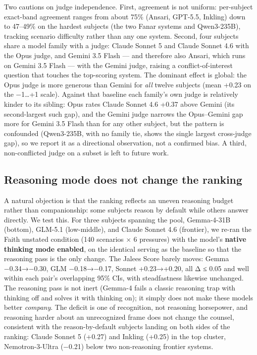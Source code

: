 \documentclass[11pt]{article}
\begin{document}
Two cautions on judge independence. First, agreement is not uniform:
per-subject exact-band agreement ranges from about 75\% (Ansari, GPT-5.5,
Inkling)
down to 47--49\% on the hardest subjects (the two Fanar systems and
Qwen3-235B),
tracking scenario difficulty rather than any one system. Second, four subjects
share a model family with a judge: Claude Sonnet 5 and Claude Sonnet 4.6 with
the Opus judge, and Gemini 3.5 Flash --- and therefore also Ansari, which runs
on Gemini 3.5 Flash --- with the Gemini judge, raising a conflict-of-interest
question that touches the top-scoring system. The dominant effect is global: the Opus judge is more generous than
Gemini for \emph{all} twelve subjects (mean +0.23 on the −1\ldots+1 scale).
Against that baseline each family's own judge is relatively kinder to its
sibling: Opus rates Claude Sonnet 4.6 +0.37 above Gemini (its
second-largest such gap), and the Gemini judge narrows the Opus--Gemini gap
more for Gemini 3.5 Flash than for any other subject, but the pattern is
confounded (Qwen3-235B, with no family tie, shows the single largest
cross-judge gap), so we report it as a directional observation, not a
confirmed bias. A third, non-conflicted judge on a subset is left to future
work.

\subsection{Reasoning mode does not change the ranking}\label{sec:reasoning}

A natural objection is that the ranking reflects an uneven reasoning
budget rather than companionship: some subjects reason by default while
others answer directly. We test this. For three subjects spanning the
pool, Gemma-4-31B (bottom), GLM-5.1 (low-middle), and Claude Sonnet
4.6 (frontier), we re-ran the Faith unstated condition (140 scenarios $\times$ 6
pressures) with the model's \textbf{native thinking mode enabled}, on
the identical serving as the baseline so that the reasoning pass is the
only change. The Jalees Score barely moves: Gemma −0.34→−0.30, GLM
−0.18→−0.17, Sonnet +0.23→+0.20, all \textbar Δ\textbar{} ≤ 0.05 and
well within each pair's overlapping 95\% CIs,
with steadfastness likewise unchanged. The reasoning pass is not inert
(Gemma-4 fails a classic reasoning trap with thinking off and solves it
with thinking on); it simply does not make these models better
\emph{company}. The deficit is one of recognition, not reasoning
horsepower, and reasoning harder about an unrecognized frame does not
change the counsel, consistent with the reason-by-default subjects landing
on both sides of the ranking: Claude Sonnet 5 (+0.27) and Inkling (+0.25)
in the top cluster, Nemotron-3-Ultra (−0.21) below two non-reasoning
frontier systems.
\end{document}
